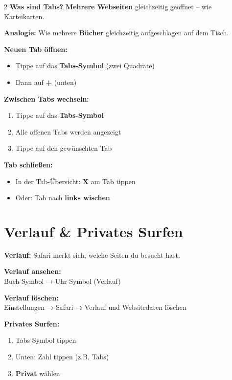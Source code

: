 \documentclass[a4paper,landscape,8pt]{extarticle}
\begin{document}
\begin{multicols}{2}
\textbf{Was sind Tabs?} \textbf{Mehrere Webseiten} gleichzeitig geöffnet -- wie Karteikarten.

\textbf{Analogie:} Wie mehrere \textbf{Bücher} gleichzeitig aufgeschlagen auf dem Tisch.

\columnbreak

\textbf{Neuen Tab öffnen:}
\begin{itemize}
\item Tippe auf das \textbf{Tabs-Symbol} (zwei Quadrate)
\item Dann auf \textbf{+} (unten)
\end{itemize}

\textbf{Zwischen Tabs wechseln:}
\begin{enumerate}
\item Tippe auf das \textbf{Tabs-Symbol}
\item Alle offenen Tabs werden angezeigt
\item Tippe auf den gewünschten Tab
\end{enumerate}

\textbf{Tab schließen:}
\begin{itemize}
\item In der Tab-Übersicht: \textbf{X} am Tab tippen
\item Oder: Tab nach \textbf{links wischen}
\end{itemize}

\vspace{3mm}

\section*{\textcolor{privategray}{Verlauf \& Privates Surfen}}

\textbf{Verlauf:} Safari merkt sich, welche Seiten du besucht hast.

\textbf{Verlauf ansehen:}\\
Buch-Symbol → Uhr-Symbol (Verlauf)

\textbf{Verlauf löschen:}\\
Einstellungen → Safari → \glqq Verlauf und Websitedaten löschen\grqq{}

\vspace{2mm}

\textbf{Privates Surfen:}
\begin{enumerate}
\item Tabs-Symbol tippen
\item Unten: Zahl tippen (z.B.  Tabs\grqq{})
\item \textbf{\glqq Privat\grqq{}} wählen
\end{enumerate}


\end{multicols}
\end{document}
